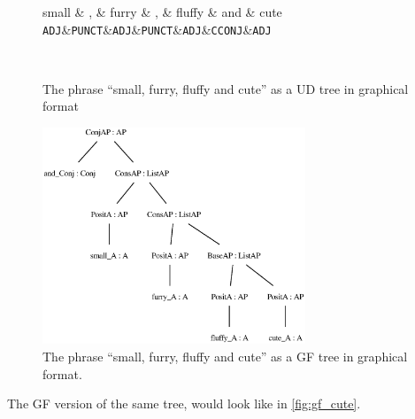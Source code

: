 \begin{figure}
    \centering
    \begin{dependency}
        \begin{deptext}[column sep=0.4cm]
              small \& , \& furry \&  , \& fluffy \& and \& cute \\
            {\tt ADJ}\&{\tt PUNCT}\&{\tt ADJ}\&{\tt PUNCT}\&{\tt ADJ}\&{\tt CCONJ}\&{\tt ADJ}\\
        \end{deptext}
    \end{dependency} \\
    \caption{The phrase ``small, furry, fluffy and cute'' as a UD tree in graphical format}
    \label{fig:ud_cute}
\end{figure}
% 

\begin{figure}
    \centering
    \includegraphics[width=0.7\textwidth]{figure/cute_gf.eps}
    \caption{The phrase ``small, furry, fluffy and cute'' as a GF tree in graphical format.}
    \label{fig:gf_cute}
\end{figure}

The GF version of the same tree, would look like in \autoref{fig:gf_cute}.

